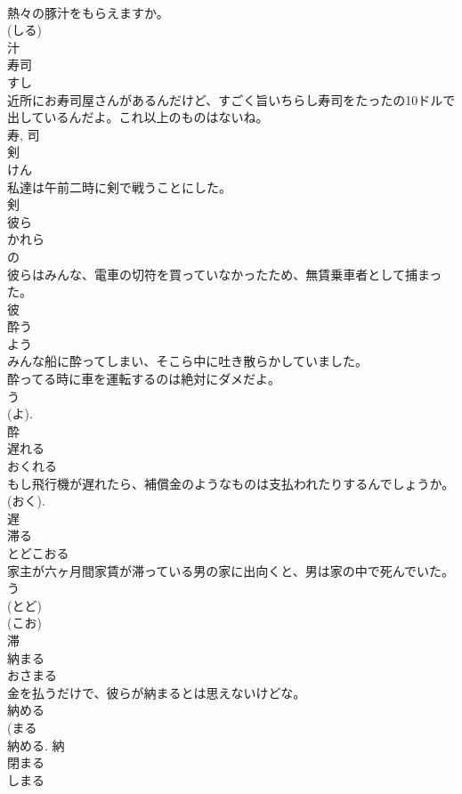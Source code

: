 \documentclass[8pt]{extreport}
\begin{document}
\begin{CJK}{UTF8}{min}
\\	熱々の豚汁をもらえますか。	
\\	(しる) 
\\	汁	
\\	寿司	
\\	すし	
\\	近所にお寿司屋さんがあるんだけど、すごく旨いちらし寿司をたったの10ドルで出しているんだよ。これ以上のものはないね。	
\\	寿, 司	
\\	剣	
\\	けん	
\\	私達は午前二時に剣で戦うことにした。	
\\	剣	
\\	彼ら	
\\	かれら	
\\	の 
\\	彼らはみんな、電車の切符を買っていなかったため、無賃乗車者として捕まった。	
\\	彼	
\\	酔う	
\\	よう	
\\	みんな船に酔ってしまい、そこら中に吐き散らかしていました。	
\\	酔ってる時に車を運転するのは絶対にダメだよ。	
\\	う 
\\	(よ). 
\\	酔	
\\	遅れる	
\\	おくれる	
\\	もし飛行機が遅れたら、補償金のようなものは支払われたりするんでしょうか。	
\\	(おく). 
\\	遅	
\\	滞る	
\\	とどこおる	
\\	家主が六ヶ月間家賃が滞っている男の家に出向くと、男は家の中で死んでいた。	
\\	う 
\\	(とど) 
\\	(こお) 
\\	滞	
\\	納まる	
\\	おさまる	
\\	金を払うだけで、彼らが納まるとは思えないけどな。	
\\	納める 
\\	(まる 
\\	納める.	納	
\\	閉まる	
\\	しまる	

\end{CJK}
\end{document}
